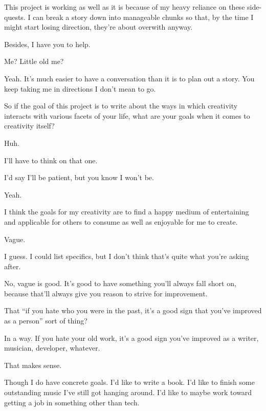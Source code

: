 This project is working as well as it is because of my heavy reliance on these side-quests. I can break a story down into manageable chunks so that, by the time I might start losing direction, they're about overwith anyway.

Besides, I have you to help.

\begin{ally}
Me? Little old me?
\end{ally}
Yeah. It's much easier to have a conversation than it is to plan out a story. You keep taking me in directions I don't mean to go.
\newpage

\begin{ally}
So if the goal of this project is to write about the ways in which creativity interacts with various facets of your life, what are your goals when it comes to creativity itself?
\end{ally}
Huh.

I'll have to think on that one.

\begin{ally}
I'd say I'll be patient, but you know I won't be.
\end{ally}
Yeah.

I think the goals for my creativity are to find a happy medium of entertaining and applicable for others to consume as well as enjoyable for me to create.

\begin{ally}
Vague.
\end{ally}
I guess. I could list specifics, but I don't think that's quite what you're asking after.

\begin{ally}
No, vague is good. It's good to have something you'll always fall short on, because that'll always give you reason to strive for improvement.
\end{ally}
That ``if you hate who you were in the past, it's a good sign that you've improved as a person'' sort of thing?

\begin{ally}
In a way. If you hate your old work, it's a good sign you've improved as a writer, musician, developer, whatever.
\end{ally}
That makes sense.

Though I do have concrete goals. I'd like to write a book. I'd like to finish some outstanding music I've still got hanging around. I'd like to maybe work toward getting a job in something other than tech.

